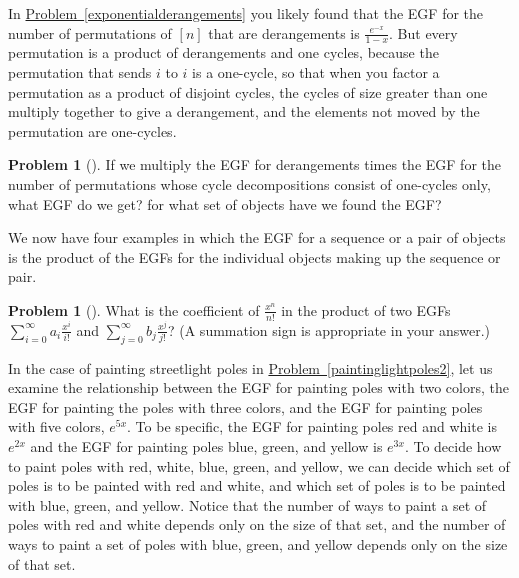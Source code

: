 \documentclass[10pt,]{book}
\theoremstyle{plain}
\theoremstyle{definition}
\newtheorem{activity}[project]{Problem}
\theoremstyle{definition}
\numberwithin{equation}{chapter}
\begin{document}
In \hyperref[exponentialderangements]{Problem~\ref{exponentialderangements}} you likely found that the EGF for the number of permutations of \([n]\) that are derangements is \(\frac{e^{-x}}{1-x}\). But every permutation is a product of derangements and one cycles, because the permutation that sends \(i\) to \(i\) is a one-cycle, so that when you factor a permutation as a product of disjoint cycles, the cycles of size greater than one multiply together to give a derangement, and the elements not moved by the permutation are one-cycles.%
\begin{activity}[] \label{derangementsand1cycles}
If we multiply the EGF for derangements times the EGF for the number of permutations whose cycle decompositions consist of one-cycles only, what EGF do we get? for what set of objects have we found the EGF?%
\end{activity}
We now have four examples in which the EGF for a sequence or a pair of objects is the product of the EGFs for the individual objects making up the sequence or pair.%
\begin{activity}[] \label{exponentialpp1}
What is the coefficient of \(\frac{x^n}{n!}\) in the product of two EGFs \(\sum_{i=0}^\infty a_i\frac{x^i}{i!}\) and \(\sum_{j=0}^\infty
b_j\frac{x^j}{j!}\)? (A summation sign is appropriate in your answer.)%
\end{activity}
 In the case of painting streetlight poles in \hyperref[paintinglightpoles2]{Problem~\ref{paintinglightpoles2}}, let us examine the relationship between the EGF for painting poles with two colors, the EGF for painting the poles with three colors, and the EGF for painting poles with five colors, \(e^{5x}\). To be specific, the EGF for painting poles red and white is \(e^{2x}\) and the EGF for painting poles blue, green, and yellow is \(e^{3x}\). To decide how to paint poles with red, white, blue, green, and yellow, we can decide  which set of poles is to be painted with red and white, and which set of poles is to be painted with blue, green, and yellow. Notice that the number of ways to paint a set of poles with red and white depends only on the size of that set, and the number of ways to paint a set of poles with blue, green, and yellow depends only on the size of that set.%
\end{document}
